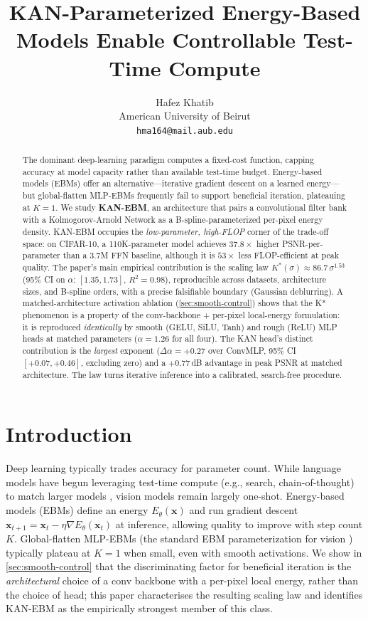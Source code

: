 \documentclass{article}
\title{KAN-Parameterized Energy-Based Models Enable Controllable Test-Time Compute}
\author{%
  Hafez Khatib \\
  American University of Beirut \\
  \texttt{hma164@mail.aub.edu}
}
\newcommand{\xx}{\mathbf{x}}
\begin{document}
\maketitle

\begin{abstract}
The dominant deep-learning paradigm computes a fixed-cost function, capping accuracy at model capacity rather than available test-time budget. Energy-based models (EBMs) offer an alternative---iterative gradient descent on a learned energy---but global-flatten MLP-EBMs frequently fail to support beneficial iteration, plateauing at $K{=}1$. We study \textbf{KAN-EBM}, an architecture that pairs a convolutional filter bank with a Kolmogorov-Arnold Network as a B-spline-parameterized per-pixel energy density. KAN-EBM occupies the \emph{low-parameter, high-FLOP} corner of the trade-off space: on CIFAR-10, a 110K-parameter model achieves $37.8{\times}$ higher PSNR-per-parameter than a 3.7M FFN baseline, although it is $53{\times}$ less FLOP-efficient at peak quality. The paper's main empirical contribution is the scaling law $K^{*}(\sigma) \approx 86.7\,\sigma^{1.53}$ (95\% CI on $\alpha$: $[1.35, 1.73]$, $R^{2}{=}0.98$), reproducible across datasets, architecture sizes, and B-spline orders, with a precise falsifiable boundary (Gaussian deblurring). A matched-architecture activation ablation (\cref{sec:smooth-control}) shows that the K* phenomenon is a property of the conv-backbone + per-pixel local-energy formulation: it is reproduced \emph{identically} by smooth (GELU, SiLU, Tanh) and rough (ReLU) MLP heads at matched parameters ($\alpha{=}1.26$ for all four). The KAN head's distinct contribution is the \emph{largest} exponent ($\Delta\alpha = +0.27$ over ConvMLP, 95\% CI $[+0.07, +0.46]$, excluding zero) and a $+0.77$\,dB advantage in peak PSNR at matched architecture. The law turns iterative inference into a calibrated, search-free procedure.
\end{abstract}

\section{Introduction}
Deep learning typically trades accuracy for parameter count. While language models have begun leveraging test-time compute (e.g., search, chain-of-thought) to match larger models \citep{snell2024llm}, vision models remain largely one-shot. Energy-based models (EBMs) define an energy $E_\theta(\xx)$ and run gradient descent $\xx_{t+1} = \xx_t - \eta\nabla E_\theta(\xx_t)$ at inference, allowing quality to improve with step count $K$. Global-flatten MLP-EBMs (the standard EBM parameterization for vision \citep{du2019implicit}) typically plateau at $K{=}1$ when small, even with smooth activations. We show in \cref{sec:smooth-control} that the discriminating factor for beneficial iteration is the \emph{architectural} choice of a conv backbone with a per-pixel local energy, rather than the choice of head; this paper characterises the resulting scaling law and identifies KAN-EBM as the empirically strongest member of this class.
\end{document}
